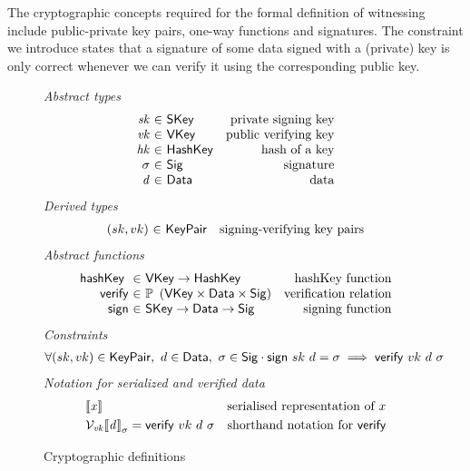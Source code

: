 \documentclass[11pt,a4paper,dvipsnames]{article}
\newcommand{\VKey}{\type{VKey}}
\newcommand{\SKey}{\type{SKey}}
\newcommand{\HashKey}{\type{HashKey}}
\newcommand{\KeyPair}{\type{KeyPair}}
\newcommand{\Sig}{\type{Sig}}
\newcommand{\Data}{\type{Data}}
\newcommand{\verify}[3]{\fun{verify} ~ #1 ~ #2 ~ #3}
\newcommand{\sign}[2]{\fun{sign} ~ #1 ~ #2}
\newcommand{\serialised}[1]{\llbracket \var{#1} \rrbracket}
\newcommand{\hashKey}[1]{\fun{hashKey}~ \var{#1}}
\theoremstyle{definition}
\theoremstyle{definition}
\begin{document}
The cryptographic concepts required for the formal definition
of witnessing include public-private key pairs, one-way functions
and signatures. The constraint we introduce states that a signature of
some data signed with a (private) key is only correct whenever we can verify
it using the corresponding public key.

\begin{figure}
  \emph{Abstract types}
  \begin{equation*}
    \begin{array}{r@{~\in~}lr}
      \var{sk} & \SKey & \text{private signing key}\\
      \var{vk} & \VKey & \text{public verifying key}\\
      \var{hk} & \HashKey & \text{hash of a key}\\
      \sigma & \Sig  & \text{signature}\\
      \var{d} & \Data  & \text{data}\\
    \end{array}
  \end{equation*}
  \emph{Derived types}
  \begin{equation*}
    \begin{array}{r@{~\in~}lr}
      (sk, vk) & \KeyPair & \text{signing-verifying key pairs}
    \end{array}
  \end{equation*}
  \emph{Abstract functions}
  \begin{equation*}
    \begin{array}{r@{~\in~}lr}
      \hashKey{} & \VKey \to \HashKey
      & \text{hashKey function} \\
      \fun{verify} & \powerset{\left(\VKey \times \Data \times \Sig\right)}
      & \text{verification relation}\\
      \fun{sign} & \SKey \to \Data \to \Sig
      & \text{signing function}\\
    \end{array}
  \end{equation*}
  \emph{Constraints}
  \begin{align*}
    & \forall (sk, vk) \in \KeyPair,~ d \in \Data,~ \sigma \in \Sig \cdot
      \sign{sk}{d} = \sigma \implies \verify{vk}{d}{\sigma}
  \end{align*}
  \emph{Notation for serialized and verified data}
  \begin{align*}
    & \serialised{x} & \text{serialised representation of } x\\
    & \mathcal{V}_{\var{vk}}{\serialised{d}}_{\sigma} = \verify{vk}{d}{\sigma}
      & \text{shorthand notation for } \fun{verify}
  \end{align*}
  \caption{Cryptographic definitions}
  \label{fig:crypto-defs}
\end{figure}
\end{document}
